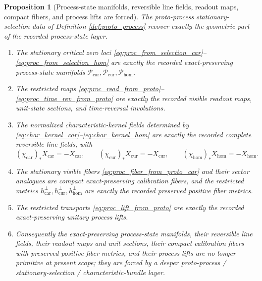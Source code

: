 \documentclass[11pt]{article}
\newcommand{\TensorProcSpace}{\mathcal P_{\mathrm{car}}}
\newcommand{\CurProcSpace}{\mathcal P_{\mathrm{cur}}}
\newcommand{\HomProcSpace}{\mathcal P_{\mathrm{hom}}}
\newcommand{\TensorFlowField}{X_{\mathrm{car}}}
\newcommand{\CurFlowField}{X_{\mathrm{cur}}}
\newcommand{\HomFlowField}{X_{\mathrm{hom}}}
\newcommand{\TensorProcTimeRev}{\chi_{\mathrm{car}}}
\newcommand{\CurProcTimeRev}{\chi_{\mathrm{cur}}}
\newcommand{\HomProcTimeRev}{\chi_{\mathrm{hom}}}
\newcommand{\TensorProcMetric}{h_{\mathrm{car}}^{\perp}}
\newcommand{\CurProcMetric}{h_{\mathrm{cur}}^{\perp}}
\newcommand{\HomProcMetric}{h_{\mathrm{hom}}^{\perp}}
\newtheorem{proposition}{Proposition}
\begin{document}
\begin{proposition}[Process-state manifolds, reversible line fields, readout maps, compact fibers, and process lifts are forced]
\label{prop:process_state_forced}
The proto-process stationary-selection data of Definition \ref{def:proto_process} recover exactly the geometric part of the recorded process-state layer.
\begin{enumerate}
    \item The stationary critical zero loci \eqref{eq:proc_from_selection_car}--\eqref{eq:proc_from_selection_hom} are exactly the recorded exact-preserving process-state manifolds \(\TensorProcSpace,\CurProcSpace,\HomProcSpace\).
    \item The restricted maps \eqref{eq:proc_read_from_proto}--\eqref{eq:proc_time_rev_from_proto} are exactly the recorded visible readout maps, unit-state sections, and time-reversal involutions.
    \item The normalized characteristic-kernel fields determined by \eqref{eq:char_kernel_car}--\eqref{eq:char_kernel_hom} are exactly the recorded complete reversible line fields, with
    \[
    (\TensorProcTimeRev)_*\TensorFlowField=-\TensorFlowField,\qquad
    (\CurProcTimeRev)_*\CurFlowField=-\CurFlowField,\qquad
    (\HomProcTimeRev)_*\HomFlowField=-\HomFlowField.
    \]
    \item The stationary visible fibers \eqref{eq:proc_fiber_from_proto_car} and their sector analogues are compact exact-preserving calibration fibers, and the restricted metrics \(\TensorProcMetric,\CurProcMetric,\HomProcMetric\) are exactly the recorded preserved positive fiber metrics.
    \item The restricted transports \eqref{eq:proc_lift_from_proto} are exactly the recorded exact-preserving unitary process lifts.
    \item Consequently the exact-preserving process-state manifolds, their reversible line fields, their readout maps and unit sections, their compact calibration fibers with preserved positive fiber metrics, and their process lifts are no longer primitive at present scope; they are forced by a deeper proto-process / stationary-selection / characteristic-bundle layer.
\end{enumerate}
\end{proposition}
\end{document}

